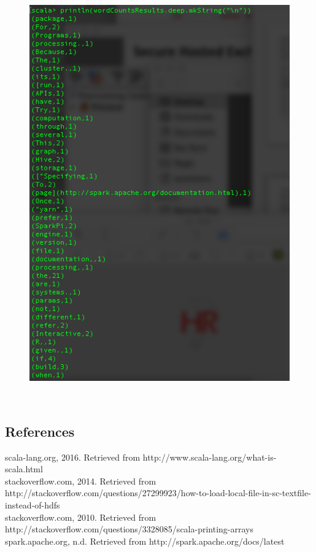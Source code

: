\documentclass[10pt]{article}
\begin{document}
\begin{figure}[!h]
\includegraphics[scale=0.37]{notCutOff.png}
\centering
\end{figure}\\
\subsection*{References}
scala-lang.org, 2016. Retrieved from http://www.scala-lang.org/what-is-scala.html\\
stackoverflow.com, 2014. Retrieved from http://stackoverflow.com/questions/27299923/how-to-load-local-file-in-sc-textfile-instead-of-hdfs\\
stackoverflow.com, 2010. Retrieved from http://stackoverflow.com/questions/3328085/scala-printing-arrays\\
spark.apache.org, n.d. Retrieved from http://spark.apache.org/docs/latest
\end{document}
